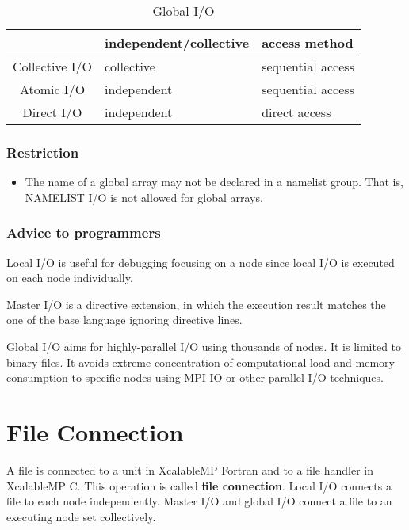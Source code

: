   \begin{table}[tb]
   \begin{center}
    \caption{Global I/O}
    \label{tb:global}
    \begin{tabular}{|c||l|l|}
     \hline 
     & independent/collective & access method  \\ \hline \hline
     Collective I/O & collective & sequential access \\ \hline
     Atomic I/O & independent & sequential access \\ \hline
     Direct I/O & independent & direct access \\ \hline
    \end{tabular}
   \end{center}
  \end{table}
  
  \subsubsection*{Restriction}

  \begin{itemize}
   \item  The name of a global array may not be declared in a namelist
	  group.
	  That is, NAMELIST I/O is not allowed for global arrays.
  \end{itemize}

  \subsubsection*{Advice to programmers}

  Local I/O is useful for debugging focusing on a node since local I/O
  is executed on each node individually.

  Master I/O is a directive extension, in which the execution result
  matches the one of the base language ignoring directive lines.

  Global I/O aims for highly-parallel I/O using thousands of nodes.
  It is limited to binary files.
  It avoids extreme concentration of computational load and memory
  consumption to specific nodes using MPI-IO or other parallel I/O
  techniques.

  \section{File Connection}

  A file is connected to a unit in XcalableMP Fortran and to a file
  handler in XcalableMP C.
  This operation is called {\bf file connection}.
  Local I/O connects a file to each node independently.
  Master I/O and global I/O connect a file to an executing node set
  collectively.
  
